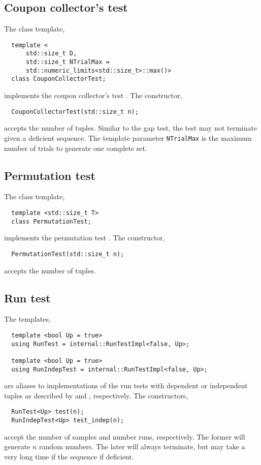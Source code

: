 \subsection{Coupon collector's test}
\label{sub:Coupon collector's test}

The class template,
\begin{Verbatim}
  template <
      std::size_t D,
      std::size_t NTrialMax =
      std::numeric_limits<std::size_t>::max()>
  class CouponCollectorTest;
\end{Verbatim}
implements the coupon collector's test \cite[pp.~64]{Knuth:1997us}. The
constructor,
\begin{Verbatim}
  CouponCollectorTest(std::size_t n);
\end{Verbatim}
accepts the number of tuples. Similar to the gap test, the test may not
terminate given a deficient sequence. The template parameter \verb|NTrialMax|
is the maximum number of trials to generate one complete set.

\subsection{Permutation test}
\label{sub:Permutation test}

The class template,
\begin{Verbatim}
  template <std::size_t T>
  class PermutationTest;
\end{Verbatim}
implements the permutation test \cite[pp.~65]{Knuth:1997us}. The constructor,
\begin{Verbatim}
  PermutationTest(std::size_t n);
\end{Verbatim}
accepts the number of tuples.

\subsection{Run test}
\label{sub:Run test}

The templates,
\begin{Verbatim}
  template <bool Up = true>
  using RunTest = internal::RunTestImpl<false, Up>;

  template <bool Up = true>
  using RunIndepTest = internal::RunTestImpl<false, Up>;
\end{Verbatim}
are aliases to implementations of the run tests with dependent or
independent tuples as described by \cite[pp.~66]{Knuth:1997us} and
\cite[ex.~14, pp.~77]{Knuth:1997us}, respectively. The constructors,
\begin{Verbatim}
  RunTest<Up> test(n);
  RunIndepTest<Up> test_indep(n);
\end{Verbatim}
accept the number of samples and number runs, respectively. The former will
generate $n$ random numbers. The later will always terminate, but may take a
very long time if the sequence if deficient.

